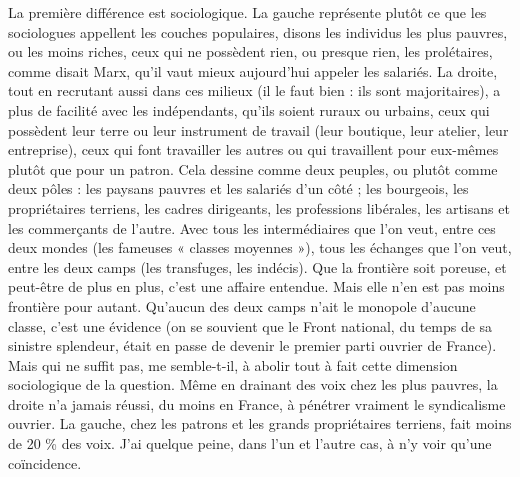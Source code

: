 La première différence est sociologique. La gauche représente plutôt ce que
les sociologues appellent les couches populaires, disons les individus les plus
pauvres, ou les moins riches, ceux qui ne possèdent rien, ou presque rien, les
prolétaires, comme disait Marx, qu’il vaut mieux aujourd’hui appeler les salariés.
La droite, tout en recrutant aussi dans ces milieux (il le faut bien : ils sont
majoritaires), a plus de facilité avec les indépendants, qu’ils soient ruraux ou
urbains, ceux qui possèdent leur terre ou leur instrument de travail (leur boutique,
leur atelier, leur entreprise), ceux qui font travailler les autres ou qui
travaillent pour eux-mêmes plutôt que pour un patron. Cela dessine comme
deux peuples, ou plutôt comme deux pôles : les paysans pauvres et les salariés
d’un côté ; les bourgeois, les propriétaires terriens, les cadres dirigeants, les professions
libérales, les artisans et les commerçants de l’autre. Avec tous les intermédiaires
que l’on veut, entre ces deux mondes (les fameuses « classes
moyennes »), tous les échanges que l’on veut, entre les deux camps (les transfuges,
les indécis). Que la frontière soit poreuse, et peut-être de plus en plus,
c’est une affaire entendue. Mais elle n’en est pas moins frontière pour autant.
Qu’aucun des deux camps n’ait le monopole d’aucune classe, c’est une évidence
(on se souvient que le Front national, du temps de sa sinistre splendeur,
était en passe de devenir le premier parti ouvrier de France). Mais qui ne suffit
pas, me semble-t-il, à abolir tout à fait cette dimension sociologique de la question.
Même en drainant des voix chez les plus pauvres, la droite n’a jamais
réussi, du moins en France, à pénétrer vraiment le syndicalisme ouvrier. La
gauche, chez les patrons et les grands propriétaires terriens, fait moins de 20 \%
des voix. J'ai quelque peine, dans l’un et l’autre cas, à n’y voir qu’une coïncidence.


